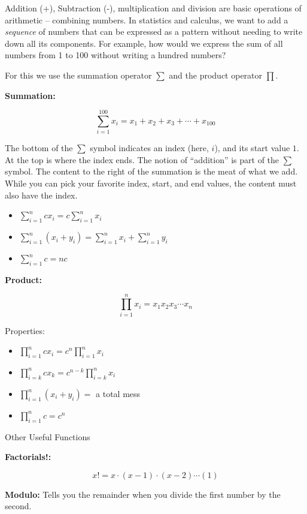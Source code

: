 \documentclass[]{book}
\providecommand{\tightlist}{%
  \setlength{\itemsep}{0pt}\setlength{\parskip}{0pt}}
\theoremstyle{definition}
\theoremstyle{definition}
\theoremstyle{definition}
\theoremstyle{remark}
\begin{document}
Addition (+), Subtraction (-), multiplication and division are basic operations of arithmetic -- combining numbers. In statistics and calculus, we want to add a \emph{sequence} of numbers that can be expressed as a pattern without needing to write down all its components. For example, how would we express the sum of all numbers from 1 to 100 without writing a hundred numbers?

For this we use the summation operator \(\sum\) and the product operator \(\prod\).

\textbf{Summation:}

\[\sum\limits_{i=1}^{100} x_i = x_1+x_2+x_3+\cdots+x_{100}\]

The bottom of the \(\sum\) symbol indicates an index (here, \(i\)), and its start value \(1\). At the top is where the index ends. The notion of ``addition'' is part of the \(\sum\) symbol. The content to the right of the summation is the meat of what we add. While you can pick your favorite index, start, and end values, the content must also have the index.

\begin{itemize}
\tightlist
\item
  \(\sum\limits_{i=1}^n c x_i = c \sum\limits_{i=1}^n x_i\)
\item
  \(\sum\limits_{i=1}^n (x_i + y_i) = \sum\limits_{i=1}^n x_i + \sum\limits_{i=1}^n y_i\)
\item
  \(\sum\limits_{i=1}^n c = n c\)
\end{itemize}

\textbf{Product:}

\[\prod\limits_{i=1}^n x_i = x_1 x_2 x_3 \cdots x_n\]

Properties:

\begin{itemize}
\tightlist
\item
  \(\prod\limits_{i=1}^n c x_i = c^n \prod\limits_{i=1}^n x_i\)
\item
  \(\prod\limits_{i=k}^n c x_k = c^{n-k} \prod\limits_{i=k}^n x_i\)
\item
  \(\prod\limits_{i=1}^n (x_i + y_i) =\) a total mess
\item
  \(\prod\limits_{i=1}^n c = c^n\)
\end{itemize}

Other Useful Functions

\textbf{Factorials!:}

\[x! = x\cdot (x-1) \cdot (x-2) \cdots (1)\]

\textbf{Modulo:} Tells you the remainder when you divide the first number by the second.
\end{document}
